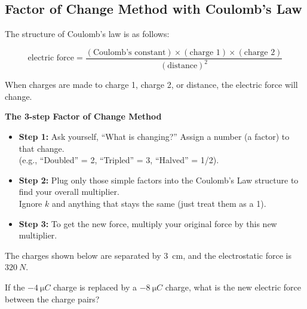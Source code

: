 \documentclass[dvipsnames]{article}
\begin{document}
\subsection*{Factor of Change Method with Coulomb's Law}

The structure of Coulomb's law is as follows:

\begin{equation*}
    \text{electric force} = \frac{\left(\text{Coulomb's constant}\right) \times \left(\text{charge 1}\right) \times \left(\text{charge 2}\right)}{\left(\text{distance}\right)^2}
\end{equation*}

When charges are made to charge 1, charge 2, or distance, the electric force will change.


\begin{mdframed}
\centering

\textbf{The 3-step Factor of Change Method}

\begin{itemize}%
    \item \textbf{Step 1:} Ask yourself, ``What is changing?'' Assign a number (a factor) to that change.\\(e.g., ``Doubled'' = 2, ``Tripled'' = 3, ``Halved'' = 1/2).
    \item \textbf{Step 2:} Plug only those simple factors into the Coulomb’s Law structure to find your overall multiplier.\\Ignore $k$ and anything that stays the same (just treat them as a 1).
    \item \textbf{Step 3:} To get the new force, multiply your original force by this new multiplier.
\end{itemize}
\end{mdframed}


\begin{example}
The charges shown below are separated by \SI{3}{cm}, and the electrostatic force is $\SI{320}{N}$.

\begin{center}
\end{center}

If the $-\SI{4}{\micro C}$ charge is replaced by a $-\SI{8}{\micro C}$ charge, what is the new electric force between the charge pairs?
\end{example}
\end{document}
